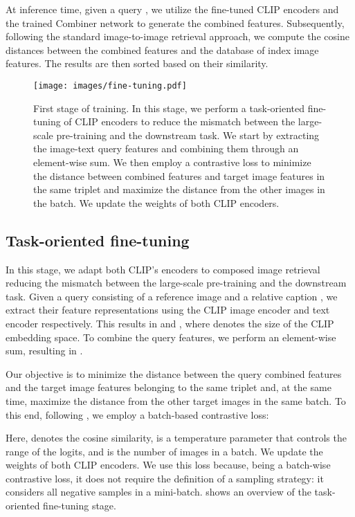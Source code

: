 \documentclass[acmlarge]{acmart}
\begin{document}
At inference time, given a query , we utilize the fine-tuned CLIP encoders and the trained Combiner network to generate the combined features. Subsequently, following the standard image-to-image retrieval approach, we compute the cosine distances between the combined features and the database of index image features. The results are then sorted based on their similarity.

\begin{figure*}[t]
  \texttt{[image: images/fine-tuning.pdf]}
  \caption{First stage of training. In this stage, we perform a task-oriented fine-tuning of CLIP encoders to reduce the mismatch between the large-scale pre-training and the downstream task. We start by extracting the 
 image-text query features and combining them through an element-wise sum. We then employ a contrastive loss to minimize the distance between combined features and target image features in the same triplet and maximize the distance from the other images in the batch. We update the weights of both CLIP encoders.}
  \label{fig:fine-tuning}
\vspace{-2.5ex}
\end{figure*}

\subsection{Task-oriented fine-tuning}
In this stage, we adapt both CLIP's encoders to composed image retrieval reducing the mismatch between the large-scale pre-training and the downstream task. 
Given a query consisting of a reference image  and a relative caption , we extract their feature representations using the CLIP image encoder  and text encoder  respectively. This results in  and , where  denotes the size of the CLIP embedding space.
To combine the query features, we perform an element-wise sum, resulting in .

Our objective is to minimize the distance between the query combined features  and the target image features  belonging to the same triplet and, at the same time, maximize the distance from the other target images in the same batch.
To this end, following \cite{vo2019composing, shin2021rtic, Lee_2021_CVPR}, we employ a batch-based contrastive loss:

Here,  denotes the cosine similarity,  is a temperature parameter that controls the range of the logits, and  is the number of images in a batch. We update the weights of both CLIP encoders.
We use this loss because, being a batch-wise contrastive loss, it does not require the definition of a sampling strategy: it considers all negative samples in a mini-batch.
 shows an overview of the task-oriented fine-tuning stage.
\end{document}
